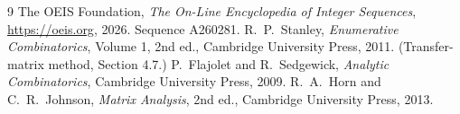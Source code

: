 \documentclass[11pt,a4paper]{article}
\theoremstyle{plain}
\theoremstyle{definition}
\begin{document}
\begin{thebibliography}{9}
 The OEIS Foundation, \emph{The On-Line Encyclopedia of Integer
Sequences}, \url{https://oeis.org}, 2026. Sequence A260281.
 R.~P.~Stanley, \emph{Enumerative Combinatorics}, Volume 1, 2nd ed.,
Cambridge University Press, 2011. (Transfer-matrix method, Section 4.7.)
 P.~Flajolet and R.~Sedgewick, \emph{Analytic Combinatorics}, Cambridge
University Press, 2009.
 R.~A.~Horn and C.~R.~Johnson, \emph{Matrix Analysis}, 2nd ed., Cambridge
University Press, 2013.
\end{thebibliography}
\end{document}
